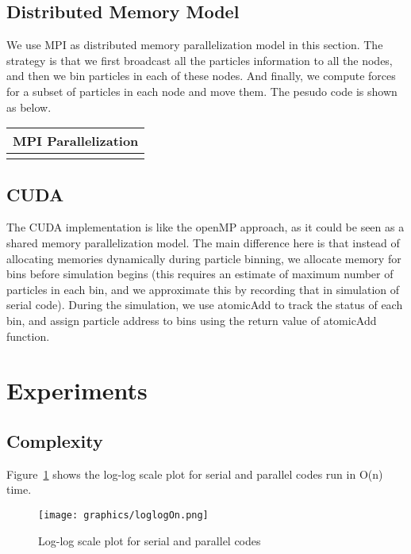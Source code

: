 \documentclass[11pt]{article}
\begin{document}
\subsection{Distributed Memory Model}
We use MPI \cite{mpi} as distributed memory parallelization model in this section. The strategy is that we first broadcast
all the particles information to all the nodes, and then we bin particles in each of these nodes. And finally, we 
compute forces for a subset of particles in each node and move them. The pesudo code is shown as below.

\begin{table}[htb]
  \centering
  \begin{tabular}{l}
    \hline
      MPI Parallelization\\
    \hline
      \\
    \hline
  \end{tabular}
  \label{tab:mpi_naive}
\end{table}

\subsection{CUDA}
The CUDA implementation is like the openMP approach, as it could be seen as a shared memory parallelization model.
The main difference here is that instead of allocating memories dynamically during particle binning, we allocate
memory for bins before simulation begins (this requires an estimate of maximum number of particles in each bin, and
we approximate this by recording that in simulation of serial code). During the simulation, we use atomicAdd to 
track the status of each bin, and assign particle address to bins using the return value of atomicAdd function.

\section{Experiments}
\subsection{Complexity}
Figure~\ref{fig:loglogOn} shows the log-log scale plot for serial and parallel codes run in O(n) time.

\begin{figure}[htb]
  \centering
  \texttt{[image: graphics/loglogOn.png]}
  \caption{Log-log scale plot for serial and parallel codes}
  \label{fig:loglogOn}
\end{figure}
\end{document}
